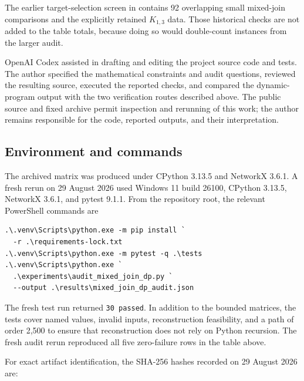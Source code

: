 \documentclass[preprint,12pt]{elsarticle}
\providecommand{\Needspace}[1]{}
\numberwithin{equation}{section}
\begin{document}
The earlier target-selection screen in
 contains 92
overlapping small mixed-join comparisons and the explicitly retained
\(K_{1,3}\) data. Those historical checks are not added to the table
totals, because doing so would double-count instances from the larger
audit.

OpenAI Codex assisted in drafting and editing the project source code and
tests. The author specified the mathematical constraints and audit questions,
reviewed the resulting source, executed the reported checks, and compared the
dynamic-program output with the two verification routes described above. The
public source and fixed archive permit inspection and rerunning of this work;
the author remains responsible for the code, reported outputs, and their
interpretation.

\subsection{Environment and commands}\label{sec:environment}

The archived matrix was produced under CPython 3.13.5 and NetworkX
3.6.1. A fresh rerun on 29 August 2026 used Windows 11 build 26100,
CPython 3.13.5, NetworkX 3.6.1, and pytest 9.1.1. From the repository
root, the relevant PowerShell commands are

\begin{verbatim}
.\.venv\Scripts\python.exe -m pip install `
  -r .\requirements-lock.txt
.\.venv\Scripts\python.exe -m pytest -q .\tests
.\.venv\Scripts\python.exe `
  .\experiments\audit_mixed_join_dp.py `
  --output .\results\mixed_join_dp_audit.json
\end{verbatim}

The fresh test run returned \texttt{30\ passed}. In addition to the
bounded matrices, the tests cover named values, invalid inputs,
reconstruction feasibility, and a path of order 2,500 to ensure that
reconstruction does not rely on Python recursion. The fresh audit rerun
reproduced all five zero-failure rows in the table above.

\Needspace{7\baselineskip}
For exact artifact identification, the SHA-256 hashes recorded on 29
August 2026 are:
\end{document}
